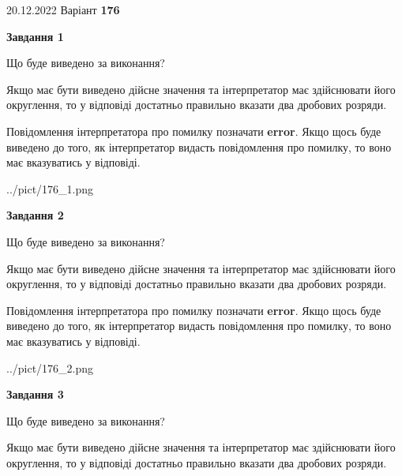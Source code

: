 \documentclass[12pt, ukrainian]{article}
\begin{document}
{20.12.2022 Варіант \No \textbf { 176 }\par}
{
\begin {Large}

{\begin {center}\textbf{Завдання 1}\end {center}}\par
Що буде виведено за виконання? \par

Якщо має бути виведено дійсне значення та інтерпретатор має здійснювати його округлення, 
то у відповіді достатньо правильно вказати два дробових розряди.

Повідомлення інтерпретатора про помилку позначати \textbf{error}.
Якщо щось буде виведено до того, як інтерпретатор видасть повідомлення про помилку, 
то воно має вказуватись у відповіді. \par

\begin{center}
	{../pict/176_1.png}
\end{center}
\newpage

{\begin {center}\textbf{Завдання 2}\end {center}}\par
Що буде виведено за виконання? \par

Якщо має бути виведено дійсне значення та інтерпретатор має здійснювати його округлення, 
то у відповіді достатньо правильно вказати два дробових розряди.

Повідомлення інтерпретатора про помилку позначати \textbf{error}.
Якщо щось буде виведено до того, як інтерпретатор видасть повідомлення про помилку, 
то воно має вказуватись у відповіді. \par

\begin{center}
	{../pict/176_2.png}
\end{center}
\newpage

{\begin {center}\textbf{Завдання 3}\end {center}}\par
Що буде виведено за виконання? \par

Якщо має бути виведено дійсне значення та інтерпретатор має здійснювати його округлення, 
то у відповіді достатньо правильно вказати два дробових розряди.


\end{Large}}
\end{document}
